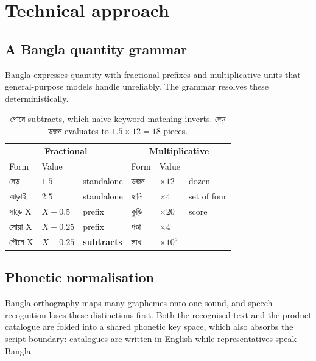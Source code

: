 \documentclass[11pt,a4paper]{article}
\newcommand{\bng}[1]{{\bn #1}}
\begin{document}
\section{Technical approach}

\subsection{A Bangla quantity grammar}

Bangla expresses quantity with fractional prefixes and multiplicative units
that general-purpose models handle unreliably. The grammar resolves these
deterministically.

\begin{table}[h]
\centering\small
\begin{tabular}{@{}l l l | l l l@{}}
\toprule
\multicolumn{3}{c|}{\textbf{Fractional}} & \multicolumn{3}{c}{\textbf{Multiplicative}}\\
Form & Value & & Form & Value & \\
\midrule
\bng{দেড়}   & $1.5$        & standalone & \bng{ডজন}  & $\times 12$ & dozen \\
\bng{আড়াই}  & $2.5$        & standalone & \bng{হালি}  & $\times 4$  & set of four \\
\bng{সাড়ে} X & $X + 0.5$    & prefix     & \bng{কুড়ি}  & $\times 20$ & score \\
\bng{সোয়া} X & $X + 0.25$   & prefix     & \bng{গণ্ডা} & $\times 4$  & \\
\bng{পৌনে} X & $X - 0.25$   & \textbf{subtracts} & \bng{লাখ} & $\times 10^5$ & \\
\bottomrule
\end{tabular}
\caption{\bng{পৌনে} subtracts, which naive keyword matching inverts. \bng{দেড় ডজন} evaluates to $1.5 \times 12 = 18$ pieces.}
\end{table}

\subsection{Phonetic normalisation}

Bangla orthography maps many graphemes onto one sound, and speech recognition
loses these distinctions first. Both the recognised text and the product
catalogue are folded into a shared phonetic key space, which also absorbs the
script boundary: catalogues are written in English while representatives speak
Bangla.
\end{document}
